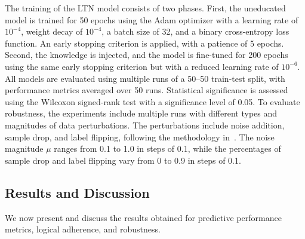 %
The training of the \gls{LTN} model consists of two phases.
%
First, the uneducated model is trained for 50 epochs using the Adam optimizer with a learning rate of \(10^{-4}\), weight decay of \(10^{-4}\), a batch size of 32, and a binary cross-entropy loss function.
%
An early stopping criterion is applied, with a patience of 5 epochs.
%
Second, the knowledge is injected, and the model is fine-tuned for 200 epochs using the same early stopping criterion but with a reduced learning rate of \(10^{-6}\).
%
All models are evaluated using multiple runs of a 50--50 train-test split, with performance metrics averaged over 50 runs.
%
Statistical significance is assessed using the Wilcoxon signed-rank test with a significance level of 0.05.
%
To evaluate robustness, the experiments include multiple runs with different types and magnitudes of data perturbations.
%
The perturbations include noise addition, sample drop, and label flipping, following the methodology in~\cite{DBLP:journals/aamas/AgiolloRMCO23}.
%
The noise magnitude \(\mu\) ranges from 0.1 to 1.0 in steps of 0.1, while the percentages of sample drop and label flipping vary from 0 to 0.9 in steps of 0.1.


\subsection{Results and Discussion}
\label{subsec:results-discussion}
%
We now present and discuss the results obtained for predictive performance metrics, logical adherence, and robustness.

%
